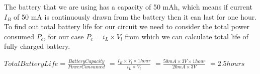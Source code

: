 The battery that we are using has a capacity of 50 mAh, which means if current $I_B$ of 50 mA  is continuously drawn from the battery then it can last for one hour. To find out total battery life for our circuit we need to consider the total power consumed $P_c$, for our case $P_c = i_L \times V_l $ from which we can calculate total life of fully charged battery.

 $Total Battery Life = \frac{Battery Capacity}{Power Consumed}$
                    $= \frac{I_B \times V_l \times 1 hour}{i_L \times V_l}$
                    $= \frac{50mA \times 3V \times 1 hour}{20mA \times 3V}$
                    $= 2.5 hours$